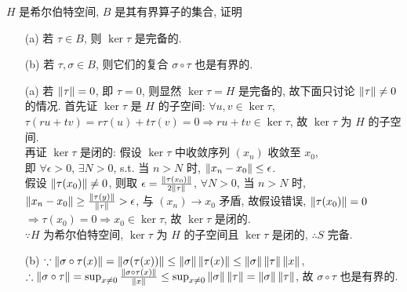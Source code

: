 \documentclass{assignment}
\begin{document}
\begin{prob}
    $H$ 是希尔伯特空间, $B$ 是其有界算子的集合, 证明
    \begin{itemize}
        \item[(a)] 若 $\tau\in B$, 则 $\ker\tau$ 是完备的.
        \item[(b)] 若 $\tau,\sigma\in B$, 则它们的复合 $\sigma\circ\tau$ 也是有界的.
    \end{itemize}
\end{prob}
\begin{pf}
    \begin{itemize}
        \item[(a)] 若 $\left\lVert\tau\right\rVert=0$, 即 $\tau=0$, 则显然 $\ker\tau=H$ 是完备的, 故下面只讨论 $\left\lVert\tau\right\rVert\neq 0$ 的情况.
        首先证 $\ker\tau$ 是 $H$ 的子空间: $\forall u,v\in\ker\tau$, $\tau(ru+tv)=r\tau(u)+t\tau(v)=0\Longrightarrow ru+tv\in\ker\tau$, 故 $\ker\tau$ 为 $H$ 的子空间.\\
        再证 $\ker\tau$ 是闭的: 假设 $\ker\tau$ 中收敛序列 $(x_n)$ 收敛至 $x_0$,\\
        即 $\forall\epsilon>0$, $\exists N>0$, s.t. 当 $n>N$ 时, $\left\lVert x_n-x_0\right\rVert\leq\epsilon$.\\
        假设 $\left\lVert\tau(x_0)\right\rVert\neq 0$, 则取 $\epsilon=\frac{\left\lVert\tau(x_0)\right\rVert}{2\left\lVert\tau\right\rVert}$, $\forall N>0$, 当 $n>N$ 时, $\left\lVert x_n-x_0\right\rVert\geq\frac{\left\lVert\tau(y)\right\rVert}{\left\lVert\tau\right\rVert}>\epsilon$, 与 $(x_n)\rightarrow x_0$ 矛盾, 故假设错误, $\left\lVert\tau(x_0)\right\rVert=0$\\
        $\Longrightarrow\tau(x_0)=0\Longrightarrow x_0\in\ker\tau$, 故 $\ker\tau$ 是闭的.\\
        $\because H$ 为希尔伯特空间, $\ker\tau$ 为 $H$ 的子空间且 $\ker\tau$ 是闭的, $\therefore S$ 完备.
        \item[(b)] $\because\left\lVert\sigma\circ\tau(x)\right\rVert=\left\lVert\sigma(\tau(x))\right\rVert\leq\left\lVert\sigma\right\rVert\left\lVert\tau(x)\right\rVert\leq\left\lVert\sigma\right\rVert\left\lVert\tau\right\rVert\left\lVert x\right\rVert$, $\therefore\left\lVert\sigma\circ\tau\right\rVert=\sup_{x\neq 0}\frac{\left\lVert\sigma\circ\tau(x)\right\rVert}{\left\lVert x\right\rVert}\leq\sup_{x\neq 0}\left\lVert\sigma\right\rVert\left\lVert\tau\right\rVert=\left\lVert\sigma\right\rVert\left\lVert\tau\right\rVert$, 故 $\sigma\circ\tau$ 也是有界的.
    \end{itemize}
\end{pf}
\end{document}
